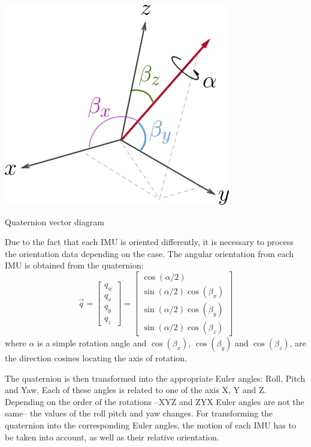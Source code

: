 \begin{marginfigure}[5cm]
	\includegraphics[width=1.1\linewidth]{figs/05/Euler}
	\caption{Quaternion vector diagram}
\end{marginfigure}
Due to the fact that each IMU is oriented differently, it is necessary to process the orientation data depending on the case. The angular orientation from each IMU is obtained from the quaternion: \[\vec{q}=\begin{bmatrix} q_{w} \\ q_{x} \\ q_{y} \\ q_{z} \end{bmatrix}=\begin{bmatrix} \cos(\alpha/2) \\ \sin(\alpha/2)\cos(\beta_{x}) \\ \sin(\alpha/2)\cos(\beta_{y}) \\ \sin(\alpha/2)\cos(\beta_{z}) \end{bmatrix}\]
where $\alpha$ is a simple rotation angle and $\cos(\beta_{x})$, $\cos(\beta_{y})$ and $\cos(\beta_{z})$, are the direction cosines locating the axis of rotation.

The quaternion is then transformed into the appropriate Euler angles: Roll, Pitch and Yaw. Each of these angles is related to one of the axis X, Y and Z. Depending on the order of the rotations --XYZ and ZYX Euler angles are not the same-- the values of the roll pitch and yaw changes. For transforming the quaternion into the corresponding Euler angles, the motion of each IMU has to be taken into account, as well as their relative orientation. 

